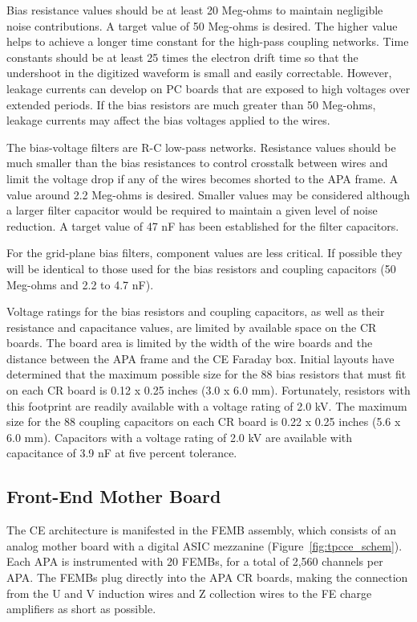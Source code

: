 Bias resistance values should be at least 20 Meg-ohms to maintain negligible noise contributions.
A target value of 50 Meg-ohms is desired.
The higher value helps to achieve a longer time constant for the high-pass coupling networks.
Time constants should be at least 25 times the electron drift time so that the undershoot in the digitized waveform
is small and easily correctable.
However, leakage currents can develop on PC boards that are exposed to high voltages over extended periods.
If the bias resistors are much greater than 50 Meg-ohms, leakage currents may affect the bias voltages applied to the wires.

The bias-voltage filters are R-C low-pass networks.
Resistance values should be much smaller than the bias resistances to control crosstalk between wires
and limit the voltage drop if any of the wires becomes shorted to the APA frame.
A value around 2.2 Meg-ohms is desired.
Smaller values may be considered although a larger filter capacitor would be required to maintain a given level of noise reduction.
A target value of 47 nF has been established for the filter capacitors.

For the grid-plane bias filters, component values are less critical.
If possible they will be identical to those used for the bias resistors and coupling capacitors
(50 Meg-ohms and 2.2 to 4.7 nF).

Voltage ratings for the bias resistors and coupling capacitors, as well as their resistance and capacitance values,
are limited by available space on the CR boards.
The board area is limited by the width of the wire boards and the distance between the APA frame and the CE Faraday box.
Initial layouts have determined that the maximum possible size for the 88 bias resistors that must fit on each CR board
is 0.12 x 0.25 inches (3.0 x 6.0 mm).
Fortunately, resistors with this footprint are readily available with a voltage rating of 2.0 kV.
The maximum size for the 88 coupling capacitors on each CR board is 0.22 x 0.25 inches (5.6 x 6.0 mm).
Capacitors with a voltage rating of 2.0 kV are available with capacitance of 3.9 nF at five percent tolerance.

%
\subsection{Front-End Mother Board}
\label{subsec:fe_arch}

The CE architecture is manifested in the FEMB assembly,
which consists of an analog mother board with a digital ASIC mezzanine (Figure~\ref{fig:tpcce_schem}).
Each APA is instrumented with 20 FEMBs, for a total of 2,560 channels per APA.
The FEMBs plug directly into the APA CR boards, making the connection from the U and V induction wires and 
Z collection wires to the FE charge amplifiers as short as possible.

